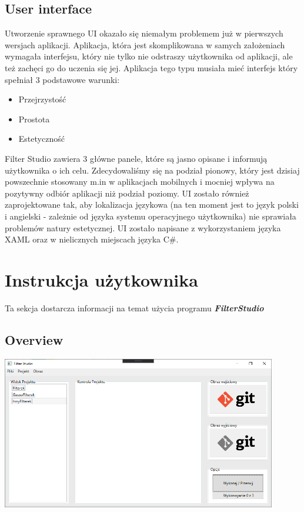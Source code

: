 \documentclass{article}
\begin{document}
\subsection{User interface}
Utworzenie sprawnego UI okazało się niemałym problemem już w pierwszych wersjach aplikacji. Aplikacja, która jest skomplikowana w samych założeniach wymagała interfejsu, który nie tylko nie odstraszy użytkownika od aplikacji, ale też zachęci go do uczenia się jej. Aplikacja tego typu musiała mieć interfejs który spełniał 3 podstawowe warunki:
\begin{itemize}
	\item Przejrzystość
	\item Prostota
	\item Estetyczność
\end{itemize}
Filter Studio zawiera 3 główne panele, które są jasno opisane i informują użytkownika o ich celu. Zdecydowaliśmy się na podział pionowy, który jest dzisiaj powszechnie stosowany m.in w aplikacjach mobilnych i mocniej wpływa na pozytywny odbiór aplikacji niż podział poziomy. UI zostało również zaprojektowane tak, aby lokalizacja językowa (na ten moment jest to język polski i angielski - zależnie od języka systemu operacyjnego użytkownika) nie sprawiała problemów natury estetycznej. UI zostało napisane z wykorzystaniem języka XAML oraz w nielicznych miejscach języka C\#.


\newpage
\section{Instrukcja użytkownika}

Ta sekcja dostarcza informacji na temat użycia programu \textbf{\textit{FilterStudio}}
\subsection{Overview}

\bigskip
\includegraphics[width=0.9\textwidth]{overview.png}
\end{document}
